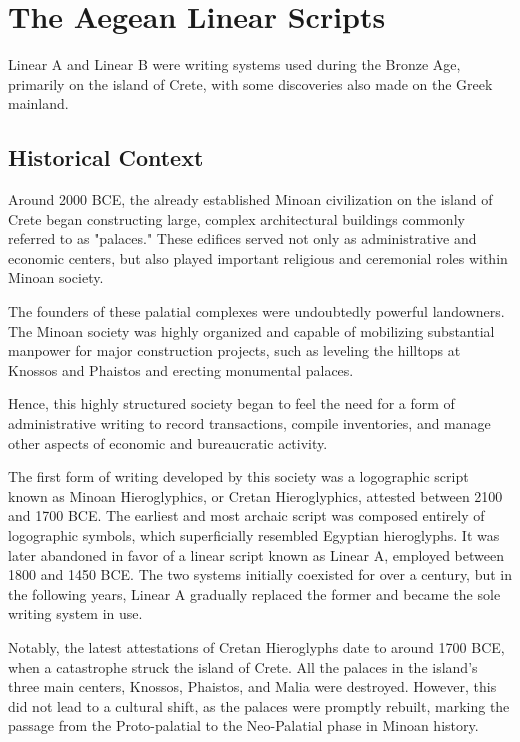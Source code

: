 \chapter{The Aegean Linear Scripts} \label{chap:history}
Linear A and Linear B were writing systems used during the Bronze Age, primarily on the island of Crete, with some discoveries also made on the Greek mainland.

\section{Historical Context}
Around 2000 BCE, the already established Minoan civilization on the island of Crete began constructing large, complex architectural buildings commonly referred to as "palaces."
These edifices served not only as administrative and economic centers, but also played important religious and ceremonial roles within Minoan society.

The founders of these palatial complexes were undoubtedly powerful landowners.
The Minoan society was highly organized and capable of mobilizing substantial manpower for major construction projects, such as leveling the hilltops at Knossos and Phaistos and erecting monumental palaces. \cite{alexiou-ch2}

Hence, this highly structured society began to feel the need for a form of administrative writing to record transactions, compile inventories, and manage other aspects of economic and bureaucratic activity.

The first form of writing developed by this society was a logographic script known as Minoan Hieroglyphics, or Cretan Hieroglyphics, attested between 2100 and 1700 BCE.
The earliest and most archaic script was composed entirely of logographic symbols, which superficially resembled Egyptian hieroglyphs.
It was later abandoned in favor of a linear script known as Linear A, employed between 1800 and 1450 BCE.
The two systems initially coexisted for over a century, but in the following years, Linear A gradually replaced the former and became the sole writing system in use. \cite{salg-ch1}

Notably, the latest attestations of Cretan Hieroglyphs date to around 1700 BCE, when a catastrophe struck the island of Crete.
All the palaces in the island's three main centers, Knossos, Phaistos, and Malia were destroyed.
However, this did not lead to a cultural shift, as the palaces were promptly rebuilt, marking the passage from the Proto-palatial to the Neo-Palatial phase in Minoan history. \cite{alexiou-ch3}


